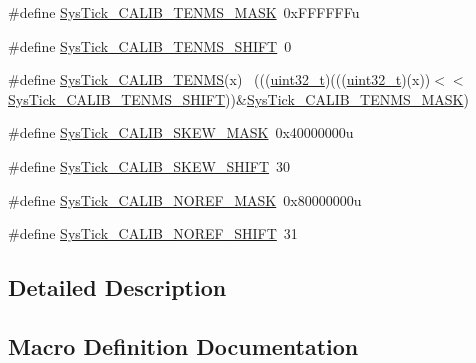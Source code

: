 \begin{DoxyCompactItemize}
\item 
\#define \hyperlink{group___sys_tick___register___masks_gac7496217678b52cce71dd785ed2b779b}{Sys\+Tick\+\_\+\+C\+A\+L\+I\+B\+\_\+\+T\+E\+N\+M\+S\+\_\+\+M\+A\+SK}~0x\+F\+F\+F\+F\+F\+Fu
\item 
\#define \hyperlink{group___sys_tick___register___masks_gad2786b21e30185770874c88e29f22047}{Sys\+Tick\+\_\+\+C\+A\+L\+I\+B\+\_\+\+T\+E\+N\+M\+S\+\_\+\+S\+H\+I\+FT}~0
\item 
\#define \hyperlink{group___sys_tick___register___masks_ga67fd5343d7d5e3040a03a9d2a0cb4f33}{Sys\+Tick\+\_\+\+C\+A\+L\+I\+B\+\_\+\+T\+E\+N\+MS}(x)                                  ~(((\hyperlink{_p_e___types_8h_a33594304e786b158f3fb30289278f5af}{uint32\+\_\+t})(((\hyperlink{_p_e___types_8h_a33594304e786b158f3fb30289278f5af}{uint32\+\_\+t})(x))$<$$<$\hyperlink{group___sys_tick___register___masks_gad2786b21e30185770874c88e29f22047}{Sys\+Tick\+\_\+\+C\+A\+L\+I\+B\+\_\+\+T\+E\+N\+M\+S\+\_\+\+S\+H\+I\+FT}))\&\hyperlink{group___sys_tick___register___masks_gac7496217678b52cce71dd785ed2b779b}{Sys\+Tick\+\_\+\+C\+A\+L\+I\+B\+\_\+\+T\+E\+N\+M\+S\+\_\+\+M\+A\+SK})
\item 
\#define \hyperlink{group___sys_tick___register___masks_gaade570cf5b9c0a8da6e1215de8db8d82}{Sys\+Tick\+\_\+\+C\+A\+L\+I\+B\+\_\+\+S\+K\+E\+W\+\_\+\+M\+A\+SK}~0x40000000u
\item 
\#define \hyperlink{group___sys_tick___register___masks_ga12bc3aae96690bf88f38e0bf46aa3d8b}{Sys\+Tick\+\_\+\+C\+A\+L\+I\+B\+\_\+\+S\+K\+E\+W\+\_\+\+S\+H\+I\+FT}~30
\item 
\#define \hyperlink{group___sys_tick___register___masks_gabca0ac6719f78220d81d2fc1328d5a45}{Sys\+Tick\+\_\+\+C\+A\+L\+I\+B\+\_\+\+N\+O\+R\+E\+F\+\_\+\+M\+A\+SK}~0x80000000u
\item 
\#define \hyperlink{group___sys_tick___register___masks_ga957057ddf04b20227820b1343b08a302}{Sys\+Tick\+\_\+\+C\+A\+L\+I\+B\+\_\+\+N\+O\+R\+E\+F\+\_\+\+S\+H\+I\+FT}~31
\end{DoxyCompactItemize}


\subsection{Detailed Description}


\subsection{Macro Definition Documentation}
